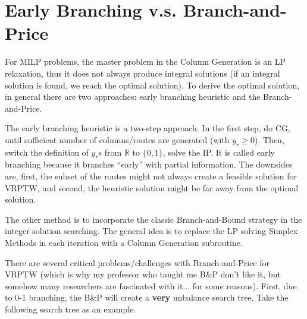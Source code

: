     \section{Early Branching v.s. Branch-and-Price}
        For MILP problems, the master problem in the Column Generation is an LP relaxation, thus it does not always produce integral solutions (if an integral solution is found, we reach the optimal solution). To derive the optimal solution, in general there are two approaches: early branching heuristic and the Branch-and-Price.

        The early branching heuristic is a two-step approach. In the first step, do CG, until sufficient number of columns/routes are generated (with $y_r \ge 0$). Then, switch the definition of $y_r$s from $\mathbb{R}$ to $\{0, 1\}$, solve the IP. It is called early branching because it branches ``early'' with partial information. The downsides are, first, the subset of the routes might not always create a feasible solution for VRPTW, and second, the heuristic solution might be far away from the optimal solution.

        The other method is to incorporate the classic Branch-and-Bound strategy in the integer solution searching. The general idea is to replace the LP solving Simplex Methods in each iteration with a Column Generation subroutine.

        There are several critical problems/challenges with Branch-and-Price for VRPTW (which is why my professor who taught me B\&P don't like it, but somehow many researchers are fascinated with it... for some reasons). First, due to 0-1 branching, the B\&P will create a \textbf{very} unbalance search tree. Take the following search tree as an example.

        \begin{figure}[h!]
            \centering
        \end{figure}

